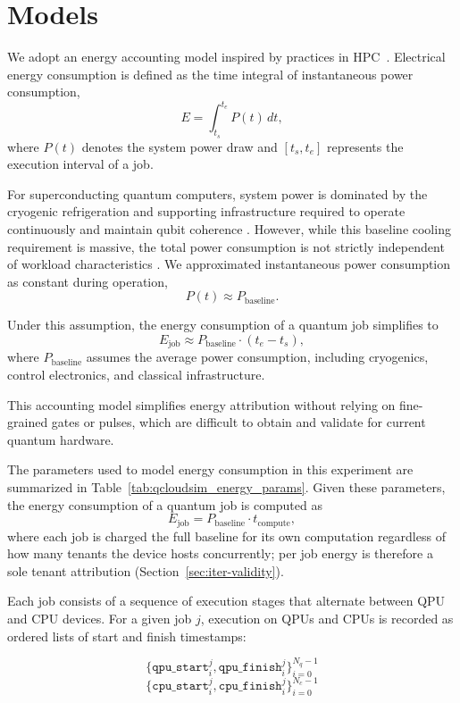 \section{Models}
\label{sec:models}

We adopt an energy accounting model inspired by practices in HPC~\cite{beloglazov2012energy}. Electrical energy consumption is defined as the time integral of instantaneous power consumption,
\[
E = \int_{t_s}^{t_e} P(t)\,dt,
\]
where \(P(t)\) denotes the system power draw and \([t_s, t_e]\) represents the execution interval of a job.

For superconducting quantum computers, system power is dominated by the cryogenic refrigeration and supporting infrastructure required to operate continuously and maintain qubit coherence \cite{matsumoto2024}. However, while this baseline cooling requirement is massive, the total power consumption is not strictly independent of workload characteristics \cite{ueno2025}. We approximated instantaneous power consumption as constant during operation,
\[
P(t) \approx P_{\text{baseline}}.
\]

Under this assumption, the energy consumption of a quantum job simplifies to
\[
E_{\text{job}} \approx P_{\text{baseline}} \cdot (t_e - t_s),
\]
where \(P_{\text{baseline}}\) assumes the average power consumption, including cryogenics, control electronics, and classical infrastructure.

This accounting model simplifies energy attribution without relying on fine-grained gates or pulses, which are difficult to obtain and validate for current quantum hardware. 

The parameters used to model energy consumption in this experiment are summarized in Table~\ref{tab:qcloudsim_energy_params}. Given these parameters, the energy consumption of a quantum job is computed as
\[
E_{\text{job}} = P_{\text{baseline}} \cdot t_{\text{compute}},
\]
where each job is charged the full baseline for its own computation regardless of how many tenants the device hosts concurrently; per job energy is therefore a sole tenant attribution (Section~\ref{sec:iter-validity}).

Each job consists of a sequence of execution stages that alternate between QPU and CPU devices. For a given job $j$, execution on QPUs and CPUs is recorded as ordered lists of start and finish timestamps:

\[
\{\texttt{qpu\_start}_i^j,\texttt{qpu\_finish}_i^j\}_{i=0}^{N_q-1}
\]
\[
\{\texttt{cpu\_start}_i^j,\texttt{cpu\_finish}_i^j\}_{i=0}^{N_c-1}
\]

